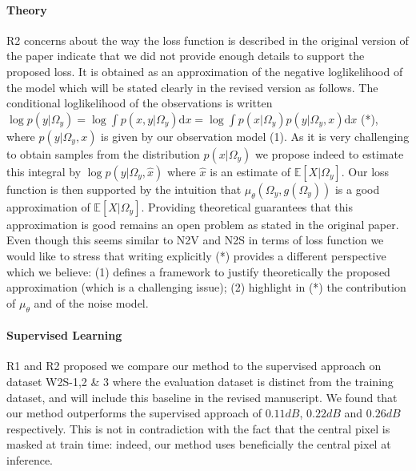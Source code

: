 \documentclass{article}
\begin{document}
\paragraph{Theory}
R2 concerns about the way the loss function is described in the original version of the paper indicate that we did not provide enough details to support the proposed loss. It is obtained as an approximation of the negative loglikelihood of the model which will be stated clearly in the revised version as follows.
The conditional loglikelihood of the observations is written $ \log p(y|\Omega_y) = \log \int p(x,y|\Omega_y) \mathrm{d}x = \log \int p(x|\Omega_y)p(y|\Omega_y,x) \mathrm{d}x$ (*), where $p(y|\Omega_y,x)$ is given by our observation model (1).
As it is very challenging to obtain samples from the distribution $p(x|\Omega_y)$ we propose indeed to estimate this integral by $\log p(y|\Omega_y,\hat {x})$ where $\hat {x}$ is an estimate of $\mathbb{E}[X|\Omega_y]$. Our loss function is then supported by the intuition that $\mu_\theta(\Omega_y,g(\Omega_y))$ is a good approximation of $\mathbb{E}[X|\Omega_y]$. Providing theoretical guarantees that this approximation is good remains an open problem as stated in the original paper. Even though this seems similar to N2V and N2S in terms of loss function we would like to stress that writing explicitly (*) provides a different perspective which we believe:
(1) defines a framework to justify theoretically the proposed approximation (which is a challenging issue); (2) highlight in (*) the contribution of $\mu_\theta$ and of the noise model.

\paragraph{Supervised Learning}
R1 and R2 proposed we compare our method to the supervised approach on dataset W2S-1,2 \& 3 where the evaluation dataset is distinct from the training dataset, and will include this baseline in the revised manuscript.
We found that our method outperforms the supervised approach of $0.11dB$, $0.22dB$ and $0.26dB$ respectively.
This is not in contradiction with the fact that the central pixel is masked at train time: indeed, our method uses beneficially the central pixel at inference.
\end{document}
